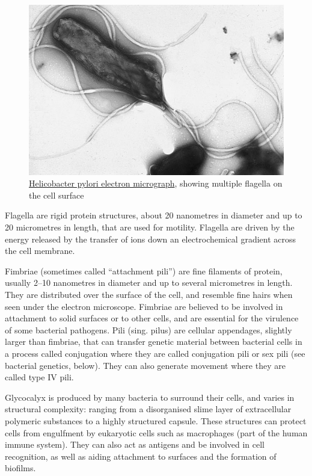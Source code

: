 \begin{figure}

{\centering \includegraphics[width=0.7\linewidth]{./figures/bacteria/EMpylori} 

}

\caption{\href{https://commons.wikimedia.org/wiki/File:EMpylori.jpg}{Helicobacter pylori electron micrograph}, showing multiple flagella on the cell surface}\label{fig:helicopylori}
\end{figure}

Flagella are rigid protein structures, about 20 nanometres in diameter and up to 20 micrometres in length, that are used for motility. Flagella are driven by the energy released by the transfer of ions down an electrochemical gradient across the cell membrane.

Fimbriae (sometimes called ``attachment pili'') are fine filaments of protein, usually 2--10 nanometres in diameter and up to several micrometres in length. They are distributed over the surface of the cell, and resemble fine hairs when seen under the electron microscope. Fimbriae are believed to be involved in attachment to solid surfaces or to other cells, and are essential for the virulence of some bacterial pathogens. Pili (sing. pilus) are cellular appendages, slightly larger than fimbriae, that can transfer genetic material between bacterial cells in a process called conjugation where they are called conjugation pili or sex pili (see bacterial genetics, below). They can also generate movement where they are called type IV pili.

Glycocalyx is produced by many bacteria to surround their cells, and varies in structural complexity: ranging from a disorganised slime layer of extracellular polymeric substances to a highly structured capsule. These structures can protect cells from engulfment by eukaryotic cells such as macrophages (part of the human immune system). They can also act as antigens and be involved in cell recognition, as well as aiding attachment to surfaces and the formation of biofilms.

